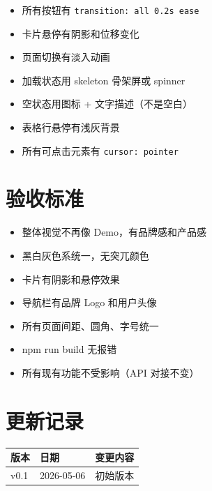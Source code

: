 \documentclass[11pt,a4paper]{article}
\begin{document}
\begin{itemize}[nosep]
  \item 所有按钮有 \texttt{transition: all 0.2s ease}
  \item 卡片悬停有阴影和位移变化
  \item 页面切换有淡入动画
  \item 加载状态用 skeleton 骨架屏或 spinner
  \item 空状态用图标 + 文字描述（不是空白）
  \item 表格行悬停有浅灰背景
  \item 所有可点击元素有 \texttt{cursor: pointer}
\end{itemize}

\section{验收标准}

\begin{itemize}
  \item[$\square$] 整体视觉不再像 Demo，有品牌感和产品感
  \item[$\square$] 黑白灰色系统一，无突兀颜色
  \item[$\square$] 卡片有阴影和悬停效果
  \item[$\square$] 导航栏有品牌 Logo 和用户头像
  \item[$\square$] 所有页面间距、圆角、字号统一
  \item[$\square$] npm run build 无报错
  \item[$\square$] 所有现有功能不受影响（API 对接不变）
\end{itemize}

\section*{更新记录}

\begin{tabular}{lll}
\toprule
版本 & 日期 & 变更内容 \\
\midrule
v0.1 & 2026-05-06 & 初始版本 \\
\bottomrule
\end{tabular}
\end{document}
